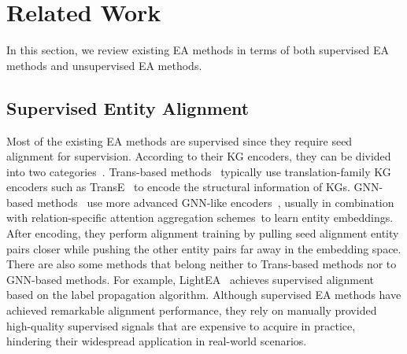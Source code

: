 \section{Related Work}
\label{sec:relate}
In this section, we review existing EA methods in terms of both supervised EA methods and unsupervised EA methods.

\subsection{Supervised Entity Alignment}
Most of the existing EA methods are supervised since they require seed alignment for supervision. According to their KG encoders, they can be divided into two categories~\cite{jiang2024toward, chen2022multi}. Trans-based methods~\cite{mtranse, jape, bootea, multike, jewp, jape, iptranse, transedge, neoea, mrpea, transedge} typically use translation-family KG encoders such as TransE~\cite{transe} to encode the structural information of KGs. GNN-based methods~\cite{gcn-align, mugnn, alinet, rdgcn, avrgcn, hgcn-je, rnm, rrea, tang2023weakly, liu2023dependency, li2023attribute, sun2022revisiting, hyperka, rea, epea, attrgnn, hman, hgcn-je-jr, gmnn, mugnn, nmn, ssp, alinet, mraea, naea, kecg, rrea, psr, largeea, roadea, cyctea, multiea,gala} use more advanced GNN-like encoders~\cite{gcn, gat}, usually in combination with relation-specific attention aggregation schemes~\cite{nathani2019learning, sheikh2021knowledge}to learn entity embeddings. After encoding, they perform alignment training by pulling seed alignment entity pairs closer while pushing the other entity pairs far away in the embedding space. There are also some methods that belong neither to Trans-based methods nor to GNN-based methods. For example, LightEA~\cite{lightea} achieves supervised alignment based on the label propagation algorithm. Although supervised EA methods have achieved remarkable alignment performance, they rely on manually provided high-quality supervised signals that are expensive to acquire in practice, hindering their widespread application in real-world scenarios.


